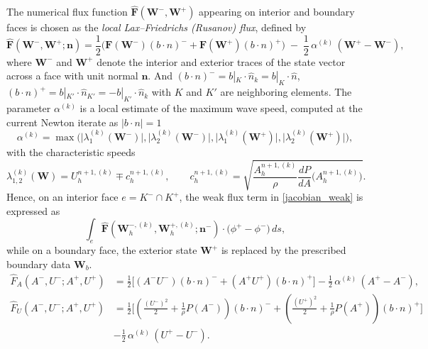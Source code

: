 \documentclass[11pt]{article}
\begin{document}
The numerical flux function $\widehat{\mathbf{F}}(\mathbf{W}^-,\mathbf{W}^+)$
appearing on interior and boundary faces is chosen as the
\emph{local Lax--Friedrichs (Rusanov) flux}, defined by
\begin{equation}\label{LF_flux}
  \boxed{
  \widehat{\mathbf{F}}(\mathbf{W}^-,\mathbf{W}^+;\bm n)
  = 
  \frac{1}{2}\Big(
      \mathbf{F}(\mathbf{W}^-)(b \cdot n)^{-}
    + \mathbf{F}(\mathbf{W}^+) (b \cdot n)^{+}
  \Big)
  \;-\;
  \frac{1}{2}\,\alpha^{(k)}\,
  (\mathbf{W}^+ - \mathbf{W}^-  ),
  }
\end{equation}
where $\mathbf{W}^-$ and $\mathbf{W}^+$ denote the interior and exterior traces
of the state vector across a face with unit normal $\bm n$. And $(b\cdot n)^{-} = b|_{K} \cdot \hat{n}_{k} = b|_{K} \cdot \hat{n}$, $(b\cdot n)^{+} =  b|_{K'} \cdot \hat{n}_{K'} = - b|_{K'} \cdot \hat{n}_{k}$ with $K$ and $K'$ are neighboring elements.
The parameter $\alpha^{(k)}$ is a local estimate of the maximum wave speed,
computed at the current Newton iterate as $|b \cdot n| =1$
\[
  \alpha^{(k)}
  =
  \max\!\Big(
      \big|\lambda_1^{(k)}(\mathbf{W}^-)\big|,
      \big|\lambda_2^{(k)}(\mathbf{W}^-)\big|,
      \big|\lambda_1^{(k)}(\mathbf{W}^+)\big|,
      \big|\lambda_2^{(k)}(\mathbf{W}^+)\big|
  \Big),
\]
with the characteristic speeds
\[
  \lambda_{1,2}^{(k)}(\mathbf{W})
  =
  U_h^{n+1,(k)} \mp c_h^{n+1,(k)},
  \qquad
  c_h^{n+1,(k)} =
  \sqrt{\frac{A_h^{n+1,(k)}}{\rho}\frac{dP}{dA}\!\big(A_h^{n+1,(k)}\big)}.
\]
Hence, on an interior face $e = K^-\cap K^+$, the weak flux term in
\eqref{jacobian_weak} is expressed as
\[
  \int_{e}
    \widehat{\mathbf{F}}(\mathbf{W}_h^{-,(k)},\mathbf{W}_h^{+,(k)};\bm n^-)
    \cdot \big(\phi^+ - \phi^-\big)\, ds,
\]
while on a boundary face, the exterior state $\mathbf{W}^+$ is replaced
by the prescribed boundary data $\mathbf{W}_b$.
\begin{equation}\label{LF_flux_componentwise}
\boxed{
\begin{aligned}
\widehat{F}_A(A^-,U^-;A^+,U^+)
&=
\frac{1}{2}\Big[
    (A^- U^-)(b \cdot n)^{-}
  + (A^+ U^+)(b \cdot n)^{+}
\Big]
-\frac{1}{2}\,\alpha^{(k)}\,
  ( A^+ - A^- ), \\[2mm]
\widehat{F}_U(A^-,U^-;A^+,U^+)
&=
\frac{1}{2}\Bigg[
    \left(\frac{(U^-)^2}{2} + \frac{1}{\rho}P(A^-)\right)(b \cdot n)^{-}
  + \left(\frac{(U^+)^2}{2} + \frac{1}{\rho}P(A^+)\right)(b \cdot n)^{+}
\Bigg]  \\[2mm]
&-\frac{1}{2}\,\alpha^{(k)}\,
  ( U^+  - U^- ).
\end{aligned}
}
\end{equation}
\end{document}

